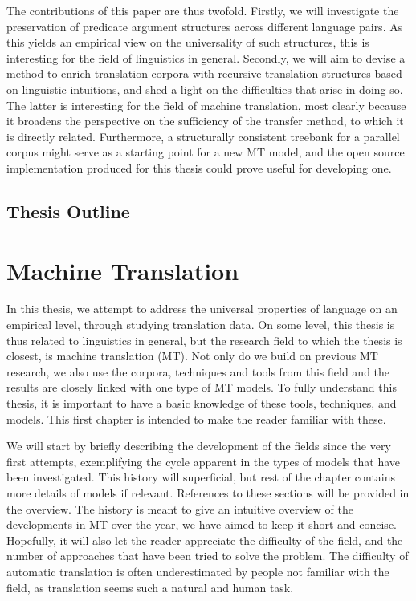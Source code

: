 \documentclass{report}
\theoremstyle{definition}
\theoremstyle{plain}
\begin{document}
The contributions of this paper are thus twofold. Firstly, we will investigate the preservation of predicate argument structures across different language pairs. As this yields an empirical view on the universality of such structures, this is interesting for the field of linguistics in general. Secondly, we will aim to devise a method to enrich translation corpora with recursive translation structures based on linguistic intuitions, and shed a light on the difficulties that arise in doing so. The latter is interesting for the field of machine translation, most clearly because it broadens the perspective on the sufficiency of the transfer method, to which it is directly related. Furthermore, a structurally consistent treebank for a parallel corpus might serve as a starting point for a new MT model, and the open source implementation produced for this thesis could prove useful for developing one.


\section*{Thesis Outline}





\chapter{Machine Translation}


In this thesis, we attempt to address the universal properties of language on an empirical level, through studying translation data. On some level, this thesis is thus related to linguistics in general, but the research field to which the thesis is closest, is machine translation (MT). Not only do we build on previous MT research, we also use the corpora, techniques and tools from this field and the results are closely linked with one type of MT models. To fully understand this thesis, it is important to have a basic knowledge of these tools, techniques, and models. This first chapter is intended to make the reader familiar with these.

We will start by briefly describing the development of the fields since the very first attempts, exemplifying the cycle apparent in the types of models that have been investigated. This history will superficial, but rest of the chapter contains more details of models if relevant. References to these sections will be provided in the overview. The history is meant to give an intuitive overview of the developments in MT over the year, we have aimed to keep it short and concise. Hopefully, it will also let the reader appreciate the difficulty of the field, and the number of approaches that have been tried to solve the problem. The difficulty of automatic translation is often underestimated by people not familiar with the field, as translation seems such a natural and human task.
\end{document}
